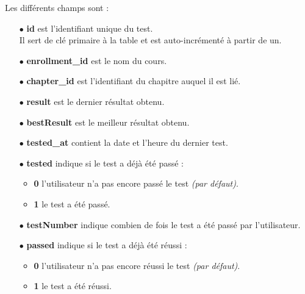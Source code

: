 Les différents champs sont :

\begin{itemize}
    
    \item[$\bullet$] \textbf{id} est l'identifiant unique du test.\\
    Il sert de clé primaire à la table et est auto-incrémenté à partir de un.
    
    \item[$\bullet$] \textbf{enrollment\_id} est le nom du cours.
    
    \item[$\bullet$] \textbf{chapter\_id} est l'identifiant du chapitre auquel il est lié.
    
    \item[$\bullet$] \textbf{result} est le dernier résultat obtenu.
    
    \item[$\bullet$] \textbf{bestResult} est le meilleur résultat obtenu.
    
    \item[$\bullet$] \textbf{tested\_at} contient la date et l'heure du dernier test.
    
    \item[$\bullet$] \textbf{tested} indique si le test a déjà été passé :
    
    \begin{itemize}
        
        \item \textbf{0} l'utilisateur n'a pas encore passé le test \textit{(par défaut)}.
        
        \item \textbf{1} le test a été passé.
        
    \end{itemize}
    
    \item[$\bullet$] \textbf{testNumber} indique combien de fois le test a été passé par l'utilisateur.
    
    \item[$\bullet$] \textbf{passed} indique si le test a déjà été réussi :
    
    \begin{itemize}
        
        \item \textbf{0} l'utilisateur n'a pas encore réussi le test \textit{(par défaut)}.
        
        \item \textbf{1} le test a été réussi.
        
    \end{itemize}
    
\end{itemize}

